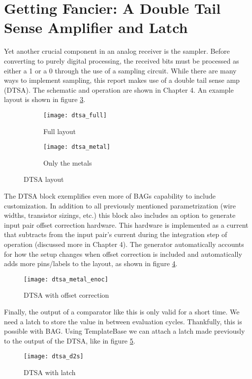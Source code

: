 \section{Getting Fancier: A Double Tail Sense Amplifier and Latch}
Yet another crucial component in an analog receiver is the sampler. Before converting to purely digital processing, the received bits must be processed as either a 1 or a 0 through the use of a sampling circuit. While there are many ways to implement sampling, this report makes use of a double tail sense amp (DTSA). The schematic and operation are shown in Chapter 4. An example layout is shown in figure \ref{fig:dtsa_ex}.
\begin{figure}[h]
\centering
\begin{subfigure}{.4\linewidth}
  \centering
  \texttt{[image: dtsa\_full]}
  \caption{Full layout}
  \label{fig:sfig1}
\end{subfigure}
\begin{subfigure}{.4\linewidth}
  \centering
\texttt{[image: dtsa\_metal]}
  \caption{Only the metals}
  \label{fig:sfig2}
\end{subfigure}
\caption{DTSA layout}
\label{fig:dtsa_ex}
\end{figure}
The DTSA block exemplifies even more of BAGs capability to include customization. In addition to all previously mentioned parametrization (wire widths, transistor sizings, etc.) this block also includes an option to generate input pair offset correction hardware. This hardware is implemented as a current that subtracts from the input pair's current during the integration step of operation (discussed more in  Chapter 4). The generator automatically accounts for how the setup changes when offset correction is included and automatically adds more pins/labels to the layout, as shown in figure \ref{fig:dtsa_enoc}.
\begin{figure}[h]
\centering
\texttt{[image: dtsa\_metal\_enoc]}
\caption{DTSA with offset correction}
\label{fig:dtsa_enoc}
\end{figure}
Finally, the output of a comparator like this is only valid for a short time. We need a latch to store the value in between evaluation cycles. Thankfully, this is possible with BAG. Using TemplateBase we can attach a latch made previously to the output of the DTSA, like in figure \ref{fig:dtsa_d2s}.
\begin{figure}[h]
\centering
\texttt{[image: dtsa\_d2s]}
\caption{DTSA with latch}
\label{fig:dtsa_d2s}
\end{figure}


